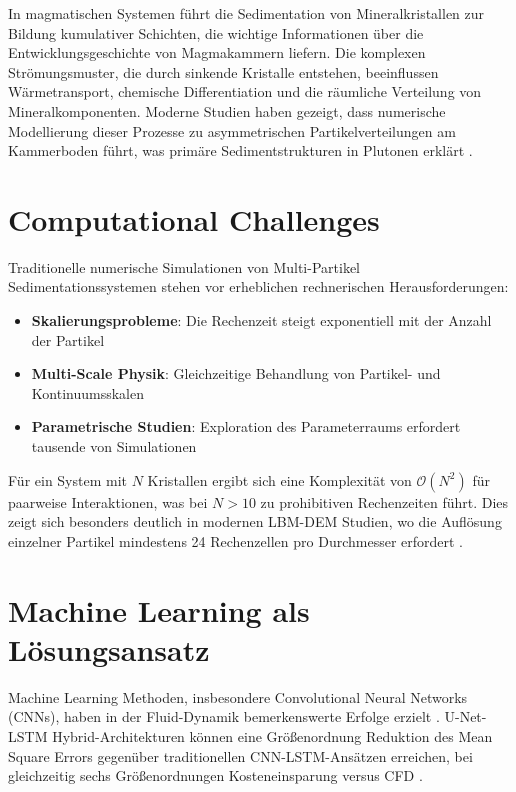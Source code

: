 \documentclass[12pt,twoside,openright]{scrreprt}
\theoremstyle{definition}
\theoremstyle{plain}
\begin{document}
In magmatischen Systemen führt die Sedimentation von Mineralkristallen zur Bildung kumulativer Schichten, die wichtige Informationen über die Entwicklungsgeschichte von Magmakammern liefern. Die komplexen Strömungsmuster, die durch sinkende Kristalle entstehen, beeinflussen Wärmetransport, chemische Differentiation und die räumliche Verteilung von Mineralkomponenten. Moderne Studien haben gezeigt, dass numerische Modellierung dieser Prozesse zu asymmetrischen Partikelverteilungen am Kammerboden führt, was primäre Sedimentstrukturen in Plutonen erklärt \parencite{verhoeven2009crystal}.

\section{Computational Challenges}

Traditionelle numerische Simulationen von Multi-Partikel Sedimentationssystemen stehen vor erheblichen rechnerischen Herausforderungen:

\begin{itemize}
	\item \textbf{Skalierungsprobleme}: Die Rechenzeit steigt exponentiell mit der Anzahl der Partikel
	\item \textbf{Multi-Scale Physik}: Gleichzeitige Behandlung von Partikel- und Kontinuumsskalen
	\item \textbf{Parametrische Studien}: Exploration des Parameterraums erfordert tausende von Simulationen
\end{itemize}

Für ein System mit $N$ Kristallen ergibt sich eine Komplexität von $\mathcal{O}(N^2)$ für paarweise Interaktionen, was bei $N > 10$ zu prohibitiven Rechenzeiten führt. Dies zeigt sich besonders deutlich in modernen LBM-DEM Studien, wo die Auflösung einzelner Partikel mindestens 24 Rechenzellen pro Durchmesser erfordert \parencite{zeng2014coupled}.

\section{Machine Learning als Lösungsansatz}

Machine Learning Methoden, insbesondere Convolutional Neural Networks (CNNs), haben in der Fluid-Dynamik bemerkenswerte Erfolge erzielt \parencite{thuerey2020deep}. U-Net-LSTM Hybrid-Architekturen können eine Größenordnung Reduktion des Mean Square Errors gegenüber traditionellen CNN-LSTM-Ansätzen erreichen, bei gleichzeitig sechs Größenordnungen Kosteneinsparung versus CFD \parencite{hou2022unet_lstm}.
\end{document}
